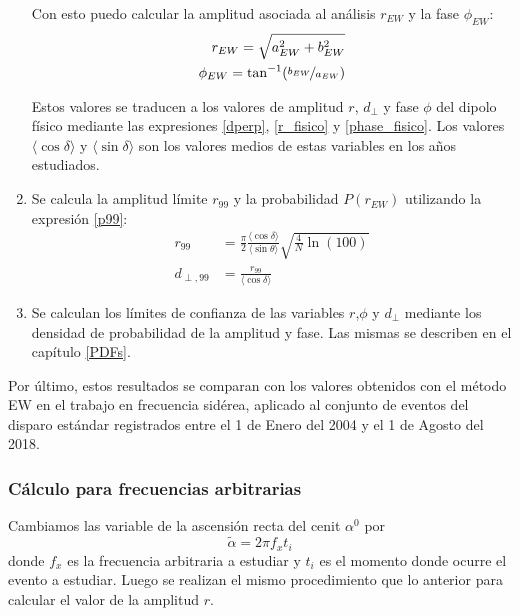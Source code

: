 \begin{enumerate}
    Con esto puedo calcular la amplitud asociada al análisis $r_{EW}$ y la fase $\phi_{EW}$:
    \begin{align*}
        r_{EW} = \sqrt{a_{EW}^2 + b_{EW}^2}\\
        \phi_{EW} = \tan^{-1}(\nicefrac{b_{EW}}{a_{EW}})
    \end{align*}

    Estos valores se traducen a los valores de amplitud $r$, $d_\perp$ y fase $\phi$ del dipolo físico mediante las expresiones \ref{dperp}, \ref{r_fisico} y \ref{phase_fisico}.   Los valores $\langle\cos\delta \rangle$ y $\langle\sin\delta \rangle$ son los valores medios de estas variables en los años estudiados. 

    \item Se calcula la amplitud límite $r_{99}$ y la probabilidad  $P(r_{EW})$ utilizando la expresión \ref{p99}:
    \begin{align*}
        r_{99} &= \frac{\pi}{2} \frac{\langle\cos\delta \rangle}{\langle\sin\theta \rangle}\sqrt{\frac{4}{N}\ln(100)}\\
        d_{\perp,99} &= \frac{r_{99}}{\langle\cos\delta \rangle}    
    \end{align*}

    \item Se calculan los límites de confianza de las variables $r$,$\phi$ y $d_\perp$ mediante los densidad de probabilidad de la amplitud y fase. Las mismas se describen en el capítulo \ref{PDFs}.


\end{enumerate}


Por último, estos resultados se comparan con los valores obtenidos con el método EW en el trabajo \cite{Aab_2020} en frecuencia sidérea, aplicado al conjunto de eventos del disparo estándar registrados entre el 1 de Enero del 2004 y el 1 de Agosto del 2018. 


\subsubsection{Cálculo para frecuencias  arbitrarias}

Cambiamos las variable de la ascensión recta del cenit $\alpha^0$ por
\begin{equation}
    \tilde{\alpha} = 2\pi f_x t_i  \label{ra_arb}
  \end{equation}
donde $f_x$ es la frecuencia arbitraria a estudiar y $t_i$ es el momento donde ocurre el evento a estudiar. Luego se realizan el mismo procedimiento que lo anterior para calcular el valor de la amplitud $r$.

